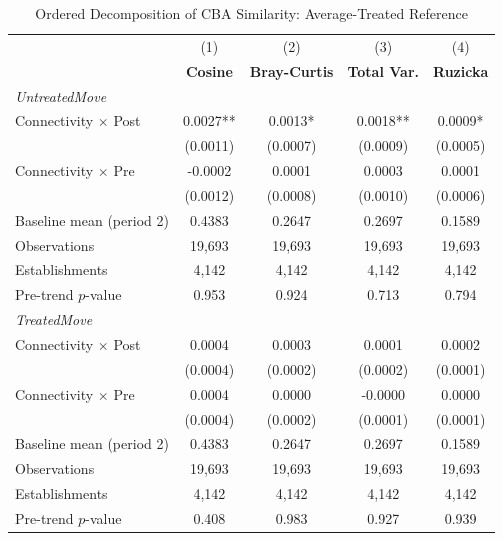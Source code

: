 \begin{table}[H]
\centering
\caption{Ordered Decomposition of CBA Similarity: Average-Treated Reference}
\scriptsize
\setlength{\tabcolsep}{8pt}
\begin{tabular}{lcccc}
\hline\hline
 & (1) & (2) & (3) & (4) \\
 & \textbf{Cosine} & \textbf{Bray-Curtis} & \textbf{Total Var.} & \textbf{Ruzicka} \\
\hline
\multicolumn{5}{l}{\textit{UntreatedMove}} \\
\quad Connectivity $\times$ Post & 0.0027** & 0.0013* & 0.0018** & 0.0009* \\
\quad & (0.0011) & (0.0007) & (0.0009) & (0.0005) \\
\quad Connectivity $\times$ Pre  & -0.0002 & 0.0001 & 0.0003 & 0.0001 \\
\quad & (0.0012) & (0.0008) & (0.0010) & (0.0006) \\
\hline
Baseline mean (period 2) & 0.4383 & 0.2647 & 0.2697 & 0.1589 \\
Observations           & 19,693 & 19,693 & 19,693 & 19,693 \\
Establishments         & 4,142 & 4,142 & 4,142 & 4,142 \\
Pre-trend $p$-value    & 0.953 & 0.924 & 0.713 & 0.794 \\
\hline
\multicolumn{5}{l}{\textit{TreatedMove}} \\
\quad Connectivity $\times$ Post & 0.0004 & 0.0003 & 0.0001 & 0.0002 \\
\quad & (0.0004) & (0.0002) & (0.0002) & (0.0001) \\
\quad Connectivity $\times$ Pre  & 0.0004 & 0.0000 & -0.0000 & 0.0000 \\
\quad & (0.0004) & (0.0002) & (0.0001) & (0.0001) \\
\hline
Baseline mean (period 2) & 0.4383 & 0.2647 & 0.2697 & 0.1589 \\
Observations           & 19,693 & 19,693 & 19,693 & 19,693 \\
Establishments         & 4,142 & 4,142 & 4,142 & 4,142 \\
Pre-trend $p$-value    & 0.408 & 0.983 & 0.927 & 0.939 \\
\hline\hline
\end{tabular}
\begin{minipage}{\linewidth}
\smallskip

\end{minipage}
\end{table}
